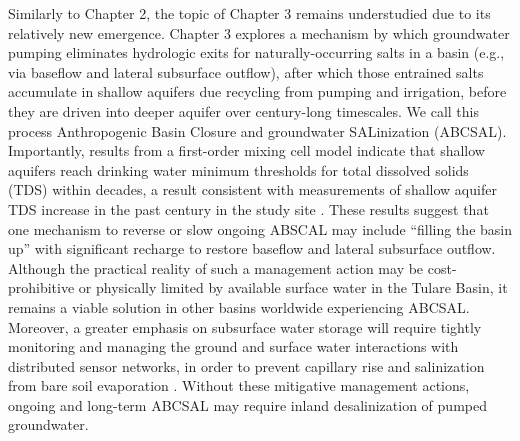 Similarly to Chapter 2, the topic of Chapter 3 remains understudied due to its relatively new emergence. Chapter 3 explores a mechanism by which groundwater pumping eliminates hydrologic exits for naturally-occurring salts in a basin (e.g., via baseflow and lateral subsurface outflow), after which those entrained salts accumulate in shallow aquifers due recycling from pumping and irrigation, before they are driven into deeper aquifer over century-long timescales. We call this process Anthropogenic Basin Closure and groundwater SALinization (ABCSAL). Importantly, results from a first-order mixing cell model indicate that shallow aquifers reach drinking water minimum thresholds for total dissolved solids (TDS) within decades, a result consistent with measurements of shallow aquifer TDS increase in the past century in the study site \citep{Hansen2018}. These results suggest that one mechanism to reverse or slow ongoing ABSCAL may include ``filling the basin up'' with significant recharge to restore baseflow and lateral subsurface outflow. Although the practical reality of such a management action may be cost-prohibitive or physically limited by available surface water in the Tulare Basin, it remains a viable solution in other basins worldwide experiencing ABCSAL. Moreover, a greater emphasis on subsurface water storage will require tightly monitoring and managing the ground and surface water interactions with distributed sensor networks, in order to prevent capillary rise and salinization from bare soil evaporation \citep{belitz1995alternative}. Without these mitigative management actions, ongoing and long-term ABCSAL may require inland desalinization of pumped groundwater.

